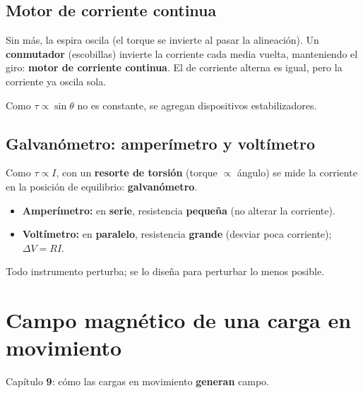 \documentclass[12pt,a4paper]{article}
\begin{document}
\subsection{Motor de corriente continua}

Sin más, la espira oscila (el torque se invierte al pasar la alineación).
Un \textbf{conmutador} (escobillas) invierte la corriente cada media
vuelta, manteniendo el giro: \textbf{motor de corriente continua}. El de
corriente alterna es igual, pero la corriente ya oscila sola.

\begin{notebox}
  Como $\tau\propto\sin\theta$ no es constante, se agregan dispositivos
  estabilizadores.
\end{notebox}



\subsection{Galvanómetro: amperímetro y voltímetro}

Como $\tau\propto I$, con un \textbf{resorte de torsión} (torque
$\propto$ ángulo) se mide la corriente en la posición de equilibrio:
\textbf{galvanómetro}.

\begin{itemize}[nosep]
  \item \textbf{Amperímetro:} en \textbf{serie}, resistencia
        \textbf{pequeña} (no alterar la corriente).
  \item \textbf{Voltímetro:} en \textbf{paralelo}, resistencia
        \textbf{grande} (desviar poca corriente); $\Delta V = RI$.
\end{itemize}

\begin{keybox}
  Todo instrumento perturba; se lo diseña para perturbar lo menos
  posible.
\end{keybox}



\section{Campo magnético de una carga en movimiento}

Capítulo \textbf{9}: cómo las cargas en movimiento \textbf{generan}
campo.
\end{document}
